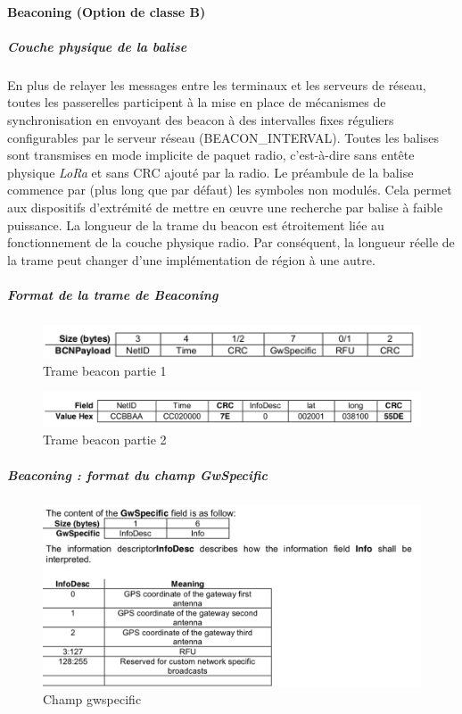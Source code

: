 \documentclass[11pt]{article}
\begin{document}
\paragraph{Beaconing (Option de classe B)}
\subparagraph{ Couche physique de la balise}
En plus de relayer les messages entre les terminaux et les serveurs de réseau, toutes les passerelles participent à la mise en place de mécanismes de synchronisation en envoyant des beacon à des intervalles fixes réguliers configurables par le serveur réseau (BEACON\_INTERVAL). Toutes les balises sont transmises en mode implicite de paquet radio, c'est-à-dire sans entête physique \textit{LoRa} et sans CRC ajouté par la radio. Le préambule de la balise commence par (plus long que par défaut) les symboles non modulés. Cela permet aux dispositifs d'extrémité de mettre en œuvre une recherche par balise à faible puissance. La longueur de la trame du beacon est étroitement liée au fonctionnement de la couche physique radio. Par conséquent, la longueur réelle de la trame peut changer d'une implémentation de région à une autre.

\subparagraph{Format de la trame de Beaconing}

\begin{figure}[h!]
\centering
\includegraphics[scale=0.6]{beacon_frame_1.png}
\caption{Trame beacon partie 1}
\end{figure}

\begin{figure}[h!]
\centering
\includegraphics[scale=0.6]{beacon_frame_2.png}
\caption{Trame beacon partie 2}
\end{figure}

\subparagraph{Beaconing : format du champ GwSpecific }

\begin{figure}[h!]
\centering
\includegraphics[scale=0.6]{beacon_gwspecific.png} 
\caption{Champ gwspecific}
\end{figure}
\end{document}

